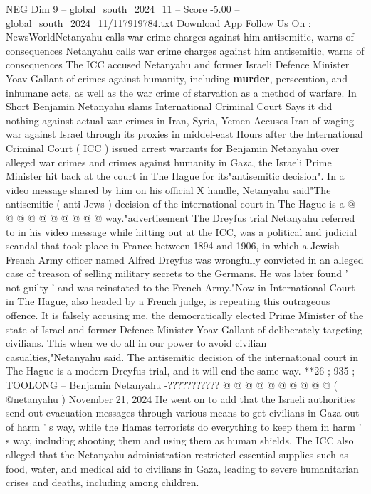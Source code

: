 \begin{textsample}{NEG Dim 9 – global\_south\_2024\_11 – Score -5.00 – global\_south\_2024\_11/117919784.txt}  \label{ex:f9_neg_412}
Download App Follow Us On : NewsWorldNetanyahu calls war crime charges against him antisemitic, warns of consequences Netanyahu calls war crime charges against him antisemitic, warns of consequences The ICC accused Netanyahu and former Israeli Defence Minister Yoav Gallant of crimes against humanity, including \textbf{murder}, persecution, and inhumane acts, as well as the war crime of starvation as a method of warfare.
In Short Benjamin Netanyahu slams International Criminal Court Says it did nothing against actual war crimes in Iran, Syria, Yemen Accuses Iran of waging war against Israel through its proxies in middel-east Hours after the International Criminal Court ( ICC ) issued arrest warrants for Benjamin Netanyahu over alleged war crimes and crimes against humanity in Gaza, the Israeli Prime Minister hit back at the court in The Hague for its"antisemitic decision".
In a video message shared by him on his official X handle, Netanyahu said"The antisemitic ( anti-Jews ) decision of the international court in The Hague is a @ @ @ @ @ @ @ @ @ @ way."advertisement The Dreyfus trial Netanyahu referred to in his video message while hitting out at the ICC, was a political and judicial scandal that took place in France between 1894 and 1906, in which a Jewish French Army officer named Alfred Dreyfus was wrongfully convicted in an alleged case of treason of selling military secrets to the Germans.
He was later found ' not guilty ' and was reinstated to the French Army."Now in International Court in The Hague, also headed by a French judge, is repeating this outrageous offence.
It is falsely accusing me, the democratically elected Prime Minister of the state of Israel and former Defence Minister Yoav Gallant of deliberately targeting civilians.
This when we do all in our power to avoid civilian casualties,"Netanyahu said.
The antisemitic decision of the international court in The Hague is a modern Dreyfus trial, and it will end the same way. **26 ; 935 ; TOOLONG -- Benjamin Netanyahu -??????????? @ @ @ @ @ @ @ @ @ @ ( @netanyahu ) November 21, 2024 He went on to add that the Israeli authorities send out evacuation messages through various means to get civilians in Gaza out of harm ' s way, while the Hamas terrorists do everything to keep them in harm ' s way, including shooting them and using them as human shields.
The ICC also alleged that the Netanyahu administration restricted essential supplies such as food, water, and medical aid to civilians in Gaza, leading to severe humanitarian crises and deaths, including among children.

\end{textsample}

